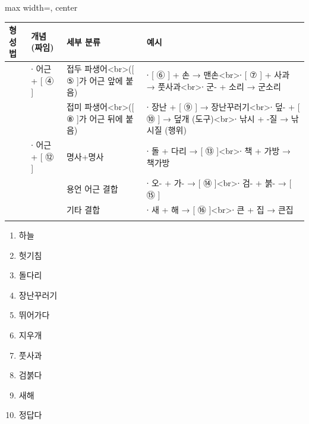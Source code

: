 \documentclass[fs9,seriesRus]{korfarm-base}
\begin{document}
\par\medskip{}
\noindent\begin{adjustbox}{max width=\linewidth, center}
\renewcommand{\arraystretch}{1.45}
\begin{tabular}{|>{\raggedright\arraybackslash}p{}|>{\raggedright\arraybackslash}p{}|>{\raggedright\arraybackslash}p{}|>{\raggedright\arraybackslash}p{}|}
\hline
\rowcolor{kfPrimaryLight!50}\textbf{\color{kfPrimary} 형성법} & \textbf{\color{kfPrimary} 개념 (짜임)} & \textbf{\color{kfPrimary} 세부 분류} & \textbf{\color{kfPrimary} 예시} \\\hline
\multirow{2}{*}{[ ③ ]} & ∙ 어근 + [ ④ ] & 접두 파생어<br>([ ⑤ ]가 어근 앞에 붙음) & ∙ [ ⑥ ] + 손 → 맨손<br>∙ [ ⑦ ] + 사과 → 풋사과<br>∙ 군- + 소리 → 군소리 \\\cline{2-4}
 & \rule[-1.0em]{0pt}{2.4em} & 접미 파생어<br>([ ⑧ ]가 어근 뒤에 붙음) & ∙ 장난 + [ ⑨ ] → 장난꾸러기<br>∙ 덮- + [ ⑩ ] → 덮개 (도구)<br>∙ 낚시 + -질 → 낚시질 (행위) \\\cline{2-4}
\multirow{3}{*}{[ ⑪ ]} & ∙ 어근 + [ ⑫ ] & 명사+명사 & ∙ 돌 + 다리 → [ ⑬ ]<br>∙ 책 + 가방 → 책가방 \\\cline{2-4}
 & \rule[-1.0em]{0pt}{2.4em} & 용언 어근 결합 & ∙ 오- + 가- → [ ⑭ ]<br>∙ 검- + 붉- → [ ⑮ ] \\\cline{2-4}
 & \rule[-1.0em]{0pt}{2.4em} & 기타 결합 & ∙ 새 + 해 → [ ⑯ ]<br>∙ 큰 + 집 → 큰집 \\\cline{2-4}
\hline
\end{tabular}
\end{adjustbox}\par\medskip\nopagebreak[4]\par\nopagebreak[4]

\kfActivityBg {}
\par{}\par\nopagebreak[4]\smallskip\nopagebreak[4]
\kfBeginMC
\begin{enumerate}[leftmargin=22pt, itemsep=6pt, topsep=4pt, label=\textbf{\arabic*.}]
\item 하늘
\item 헛기침
\item 돌다리
\item 장난꾸러기
\item 뛰어가다
\item 지우개
\item 풋사과
\item 검붉다
\item 새해
\item 정답다
\end{enumerate}
\kfEndMC
\end{document}
